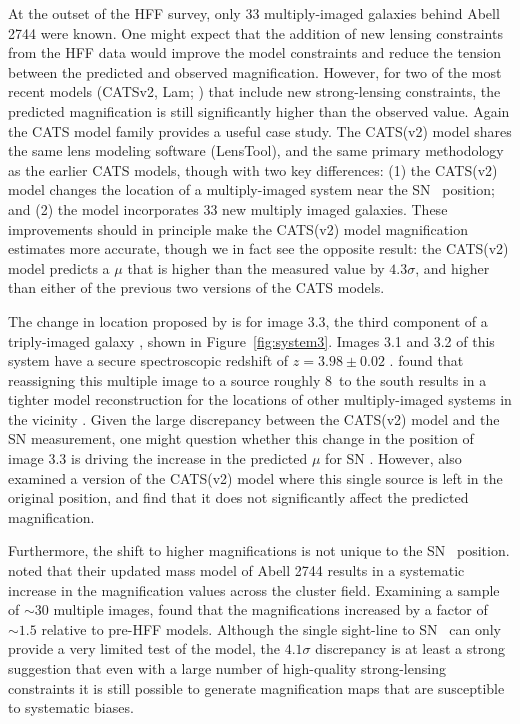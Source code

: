 At the outset of the HFF survey, only 33 multiply-imaged galaxies
behind Abell 2744 were known.  One might expect that the addition of
new lensing constraints from the HFF data would improve the model
constraints and reduce the tension between the predicted and observed
magnification.  However, for two of the most recent models (CATSv2,
Lam; \citealt{Jauzac:2014c,Lam:2014}) that include new strong-lensing
constraints, the predicted magnification is still significantly higher
than the observed value.  Again the CATS model family provides a
useful case study.  The CATS(v2) model \citep[from][]{Jauzac:2014c}
shares the same lens modeling software (LensTool), and the same
primary methodology as the earlier CATS models, though with two key
differences: (1) the CATS(v2) model changes the location of a
multiply-imaged system near the SN \tomas\ position; and (2) the model
incorporates 33 new multiply imaged galaxies.  These improvements
should in principle make the CATS(v2) model magnification estimates
more accurate, though we in fact see the opposite result: the
CATS(v2) model predicts a $\mu$ that is higher than the measured
value by $4.3\sigma$, and higher than either of the previous two
versions of the CATS models.

The change in location proposed by \citet{Jauzac:2014c} is for image
3.3, the third component of a triply-imaged
galaxy \citep{Merten:2011}, shown in Figure~\ref{fig:system3}.  Images
3.1 and 3.2 of this system have a secure spectroscopic redshift of
$z=3.98\pm0.02$ \citep{Johnson:2014}. \citet{Jauzac:2014c} found that
reassigning this multiple image to a source roughly 8\arcsec\ to the
south results in a tighter model reconstruction for the locations of
other multiply-imaged systems in the vicinity \citep[though][argue
against the reassignment based on the colors of the two sources in
question]{Lam:2014}.  Given the large discrepancy between the
CATS(v2) model and the SN measurement, one might question whether
this change in the position of image 3.3 is driving the increase in
the predicted $\mu$ for SN \tomas. However, \citet{Jauzac:2014c} also
examined a version of the CATS(v2) model where this single source
is left in the original position, and find that it does not
significantly affect the predicted magnification.

Furthermore, the shift to higher magnifications is not unique to the
SN \tomas\ position.  \citet{Jauzac:2014c} noted that their updated
mass model of Abell 2744 results in a systematic increase in the
magnification values across the cluster field. Examining a sample of
$\sim$30 multiple images, \citeauthor{Jauzac:2014c} found that the
magnifications increased by a factor of $\sim1.5$ relative to pre-HFF
models.  Although the single sight-line to SN \tomas\ can
only provide a very limited test of the model,
the $4.1\sigma$ discrepancy is at least a strong suggestion
that even with a large number of high-quality strong-lensing
constraints it is still possible to generate magnification
maps that are susceptible to systematic biases.

